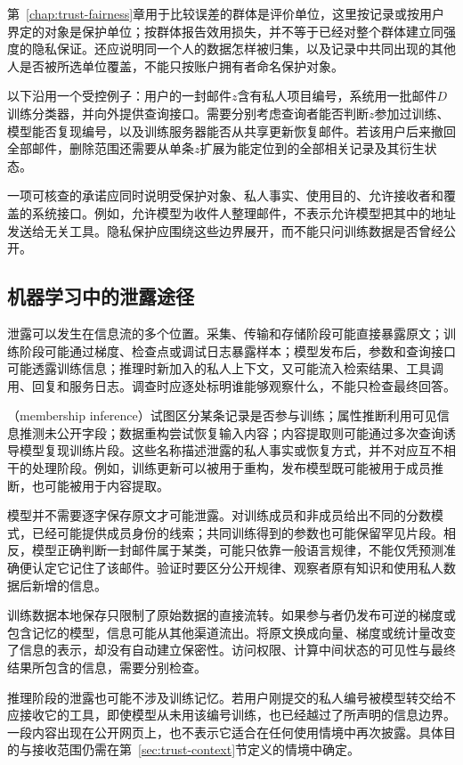 第~\ref{chap:trust-fairness}章用于比较误差的群体是评价单位，这里按记录或按用户界定的对象是保护单位；按群体报告效用损失，并不等于已经对整个群体建立同强度的隐私保证。还应说明同一个人的数据怎样被归集，以及记录中共同出现的其他人是否被所选单位覆盖，不能只按账户拥有者命名保护对象。

以下沿用一个受控例子：用户的一封邮件$z$含有私人项目编号，系统用一批邮件$D$训练分类器，并向外提供查询接口。需要分别考虑查询者能否判断$z$参加过训练、模型能否复现编号，以及训练服务器能否从共享更新恢复邮件。若该用户后来撤回全部邮件，删除范围还需要从单条$z$扩展为能定位到的全部相关记录及其衍生状态。

一项可核查的承诺应同时说明受保护对象、私人事实、使用目的、允许接收者和覆盖的系统接口。例如，允许模型为收件人整理邮件，不表示允许模型把其中的地址发送给无关工具。隐私保护应围绕这些边界展开，而不能只问训练数据是否曾经公开。

\subsection{机器学习中的泄露途径}
\label{sec:privacy-leakage-channels}

泄露可以发生在信息流的多个位置。采集、传输和存储阶段可能直接暴露原文；训练阶段可能通过梯度、检查点或调试日志暴露样本；模型发布后，参数和查询接口可能透露训练信息；推理时新加入的私人上下文，又可能流入检索结果、工具调用、回复和服务日志。调查时应逐处标明谁能够观察什么，不能只检查最终回答。

（membership inference）试图区分某条记录是否参与训练；属性推断利用可见信息推测未公开字段；数据重构尝试恢复输入内容；内容提取则可能通过多次查询诱导模型复现训练片段。这些名称描述泄露的私人事实或恢复方式，并不对应互不相干的处理阶段。例如，训练更新可以被用于重构，发布模型既可能被用于成员推断，也可能被用于内容提取。

模型并不需要逐字保存原文才可能泄露。对训练成员和非成员给出不同的分数模式，已经可能提供成员身份的线索；共同训练得到的参数也可能保留罕见片段。相反，模型正确判断一封邮件属于某类，可能只依靠一般语言规律，不能仅凭预测准确便认定它记住了该邮件。验证时要区分公开规律、观察者原有知识和使用私人数据后新增的信息。

训练数据本地保存只限制了原始数据的直接流转。如果参与者仍发布可逆的梯度或包含记忆的模型，信息可能从其他渠道流出。将原文换成向量、梯度或统计量改变了信息的表示，却没有自动建立保密性。访问权限、计算中间状态的可见性与最终结果所包含的信息，需要分别检查。

推理阶段的泄露也可能不涉及训练记忆。若用户刚提交的私人编号被模型转交给不应接收它的工具，即使模型从未用该编号训练，也已经越过了所声明的信息边界。一段内容出现在公开网页上，也不表示它适合在任何使用情境中再次披露。具体目的与接收范围仍需在第~\ref{sec:trust-context}节定义的情境中确定。

